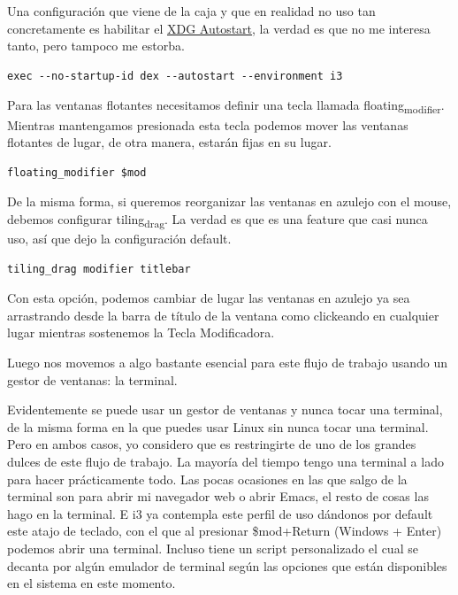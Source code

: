 \documentclass[11pt]{article}
\begin{document}
Una configuración que viene de la caja y que en realidad no uso tan concretamente es habilitar el \href{https://wiki.archlinux.org/title/XDG\_Autostart}{XDG Autostart}, la verdad es que no me interesa tanto, pero tampoco me estorba.

\begin{verbatim}
exec --no-startup-id dex --autostart --environment i3
\end{verbatim}

Para las ventanas flotantes necesitamos definir una tecla llamada floating\textsubscript{modifier}. Mientras mantengamos presionada esta tecla podemos mover las ventanas flotantes de lugar, de otra manera, estarán fijas en su lugar.

\begin{verbatim}
floating_modifier $mod
\end{verbatim}

De la misma forma, si queremos reorganizar las ventanas en azulejo con el mouse, debemos configurar tiling\textsubscript{drag}. La verdad es que es una feature que casi nunca uso, así que dejo la configuración default.

\begin{verbatim}
tiling_drag modifier titlebar
\end{verbatim}

Con esta opción, podemos cambiar de lugar las ventanas en azulejo ya sea arrastrando desde la barra de título de la ventana como clickeando en cualquier lugar mientras sostenemos la Tecla Modificadora.

Luego nos movemos a algo bastante esencial para este flujo de trabajo usando un gestor de ventanas: la terminal.

Evidentemente se puede usar un gestor de ventanas y nunca tocar una terminal, de la misma forma en la que puedes usar Linux sin nunca tocar una terminal. Pero en ambos casos, yo considero que es restringirte de uno de los grandes dulces de este flujo de trabajo. La mayoría del tiempo tengo una terminal a lado para hacer prácticamente todo. Las pocas ocasiones en las que salgo de la terminal son para abrir mi navegador web o abrir Emacs, el resto de cosas las hago en la terminal. E i3 ya contempla este perfil de uso dándonos por default este atajo de teclado, con el que al presionar \$mod+Return (Windows + Enter) podemos abrir una terminal. Incluso tiene un script personalizado el cual se decanta por algún emulador de terminal según las opciones que están disponibles en el sistema en este momento.
\end{document}
